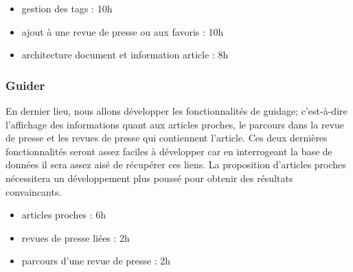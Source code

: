 		\begin{itemize}
			\item gestion des tags : 10h
			\item ajout à une revue de presse ou aux favoris : 10h
			\item architecture document et information article : 8h
		\end{itemize}

	\subsubsection{Guider}
	\label{subsec:guider}
		En dernier lieu, nous allons développer les fonctionnalités de guidage; c'est-à-dire l'affichage des informations quant aux articles proches, le parcours dans la revue de presse et les revues de presse qui contiennent l'article. Ces deux dernières fonctionnalités seront assez faciles à développer car en interrogeant la base de données il sera assez aisé de récupérer ces liens. La proposition d'articles proches nécessitera un développement plus poussé pour obtenir des résultats convaincants.

		\begin{itemize}
			\item articles proches : 6h
			\item revues de presse liées : 2h
			\item parcours d'une revue de presse : 2h
		\end{itemize}